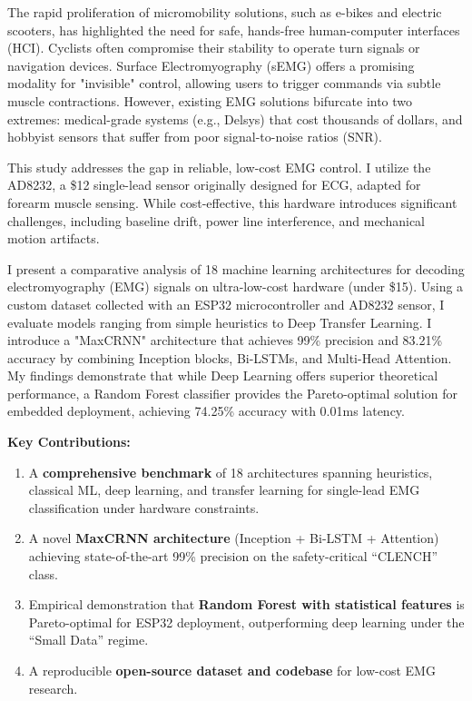 \documentclass{article}
\begin{document}
The rapid proliferation of micromobility solutions, such as e-bikes and electric scooters, has highlighted the need for safe, hands-free human-computer interfaces (HCI). Cyclists often compromise their stability to operate turn signals or navigation devices. Surface Electromyography (sEMG) \cite{hopkins} offers a promising modality for "invisible" control, allowing users to trigger commands via subtle muscle contractions. However, existing EMG solutions bifurcate into two extremes: medical-grade systems (e.g., Delsys) that cost thousands of dollars, and hobbyist sensors that suffer from poor signal-to-noise ratios (SNR).

This study addresses the gap in reliable, low-cost EMG control. I utilize the AD8232, a \$12 single-lead sensor originally designed for ECG, adapted for forearm muscle sensing. While cost-effective, this hardware introduces significant challenges, including baseline drift, power line interference, and mechanical motion artifacts.

I present a comparative analysis of 18 machine learning architectures for decoding electromyography (EMG) signals on ultra-low-cost hardware (under \$15). Using a custom dataset collected with an ESP32 microcontroller and AD8232 sensor, I evaluate models ranging from simple heuristics to Deep Transfer Learning. I introduce a "MaxCRNN" architecture that achieves 99\% precision and 83.21\% accuracy by combining Inception blocks, Bi-LSTMs, and Multi-Head Attention. My findings demonstrate that while Deep Learning offers superior theoretical performance, a Random Forest classifier provides the Pareto-optimal solution for embedded deployment, achieving 74.25\% accuracy with 0.01ms latency.

\textbf{Key Contributions:}
\begin{enumerate}
    \item A \textbf{comprehensive benchmark} of 18 architectures spanning heuristics, classical ML, deep learning, and transfer learning for single-lead EMG classification under hardware constraints.
    \item A novel \textbf{MaxCRNN architecture} (Inception + Bi-LSTM + Attention) achieving state-of-the-art 99\% precision on the safety-critical ``CLENCH'' class.
    \item Empirical demonstration that \textbf{Random Forest with statistical features} is Pareto-optimal for ESP32 deployment, outperforming deep learning under the ``Small Data'' regime.
    \item A reproducible \textbf{open-source dataset and codebase} for low-cost EMG research.
\end{enumerate}
\end{document}
